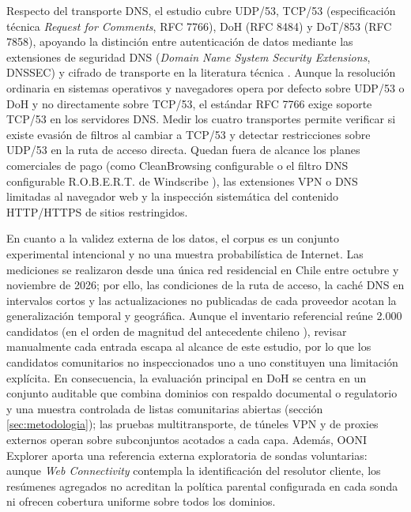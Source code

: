 \documentclass[10pt,a4paper]{article}
\begin{document}
Respecto del transporte DNS, el estudio cubre UDP/53, TCP/53 (especificación técnica \emph{Request for Comments}, RFC 7766), DoH (RFC 8484) y DoT/853 (RFC 7858), apoyando la distinción entre autenticación de datos mediante las extensiones de seguridad DNS (\emph{Domain Name System Security Extensions}, DNSSEC) y cifrado de transporte en la literatura técnica \cite{rfc7766,rfc4033,rfc8484,rfc7858}. Aunque la resolución ordinaria en sistemas operativos y navegadores opera por defecto sobre UDP/53 o DoH y no directamente sobre TCP/53, el estándar RFC 7766 exige soporte TCP/53 en los servidores DNS. Medir los cuatro transportes permite verificar si existe evasión de filtros al cambiar a TCP/53 y detectar restricciones sobre UDP/53 en la ruta de acceso directa. Quedan fuera de alcance los planes comerciales de pago (como CleanBrowsing configurable \cite{cleanbrowsingapi,cleanbrowsingcategories} o el filtro DNS configurable R.O.B.E.R.T. de Windscribe \cite{windscribeplans}), las extensiones VPN o DNS limitadas al navegador web y la inspección sistemática del contenido HTTP/HTTPS de sitios restringidos.

En cuanto a la validez externa de los datos, el corpus es un conjunto experimental intencional y no una muestra probabilística de Internet. Las mediciones se realizaron desde una única red residencial en Chile entre octubre y noviembre de 2026; por ello, las condiciones de la ruta de acceso, la caché DNS en intervalos cortos y las actualizaciones no publicadas de cada proveedor acotan la generalización temporal y geográfica. Aunque el inventario referencial reúne 2.000 candidatos (en el orden de magnitud del antecedente chileno \cite{rojas2025ieee}), revisar manualmente cada entrada escapa al alcance de este estudio, por lo que los candidatos comunitarios no inspeccionados uno a uno constituyen una limitación explícita. En consecuencia, la evaluación principal en DoH se centra en un conjunto auditable que combina dominios con respaldo documental o regulatorio y una muestra controlada de listas comunitarias abiertas \cite{ut1,stevenblack} (sección \ref{sec:metodologia}); las pruebas multitransporte, de túneles VPN y de proxies externos operan sobre subconjuntos acotados a cada capa. Además, OONI Explorer aporta una referencia externa exploratoria de sondas voluntarias: aunque \emph{Web Connectivity} contempla la identificación del resolutor cliente, los resúmenes agregados no acreditan la política parental configurada en cada sonda ni ofrecen cobertura uniforme sobre todos los dominios.
\end{document}
